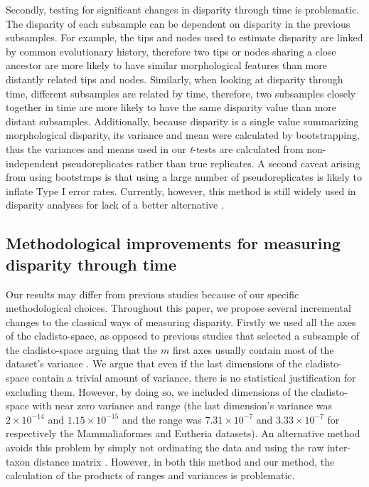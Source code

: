 \documentclass[10pt,letterpaper]{article}
\begin{document}
Secondly, testing for significant changes in disparity through time is problematic.
The disparity of each subsample can be dependent on disparity in the previous subsamples.
For example, the tips and nodes used to estimate disparity are linked by common evolutionary history, therefore two tips or nodes sharing a close ancestor are more likely to have similar morphological features than more distantly related tips and nodes.
Similarly, when looking at disparity through time, different subsamples are related by time, therefore, two subsamples closely together in time are more likely to have the same disparity value than more distant subsamples.
Additionally, because disparity is a single value summarizing morphological disparity, its variance and mean were calculated by bootstrapping, thus the variances and means used in our \textit{t}-tests are calculated from non-independent pseudoreplicates rather than true replicates.
A second caveat arising from using bootstraps is that using a large number of pseudoreplicates is likely to inflate Type I error rates. 
Currently, however, this method is still widely used in disparity analyses for lack of a better alternative \citep[e.g.][]{anderson2012using,zelditch2012geometric,smith2014joined}.

\subsection{Methodological improvements for measuring disparity through time}
Our results may differ from previous studies because of our specific methodological choices.
Throughout this paper, we propose several incremental changes to the classical ways of measuring disparity.
Firstly we used all the axes of the cladisto-space, as opposed to previous studies that selected a subsample of the cladisto-space arguing that the $m$ first axes usually contain most of the dataset's variance \citep[e.g][]{brusatte50,cisneros2010,prentice2011,anderson2012using,Hughes20082013,bentonmodels2014}.
We argue that even if the last dimensions of the cladisto-space contain a trivial amount of variance, there is no statistical justification for excluding them.
However, by doing so, we included dimensions of the cladisto-space with near zero variance and range (the last dimension's variance was $2\times10^{-14}$ and $1.15\times10^{-15}$ and the range was $7.31\times10^{-7}$ and $3.33\times10^{-7}$ for respectively the Mammaliaformes and Eutheria datasets).
An alternative method avoids this problem by simply not ordinating the data and using the raw inter-taxon distance matrix \citep[e.g.][]{bensonfaunal2014,Close2015}. 
However, in both this method and our method, the calculation of the products of ranges and variances is problematic.
\end{document}
